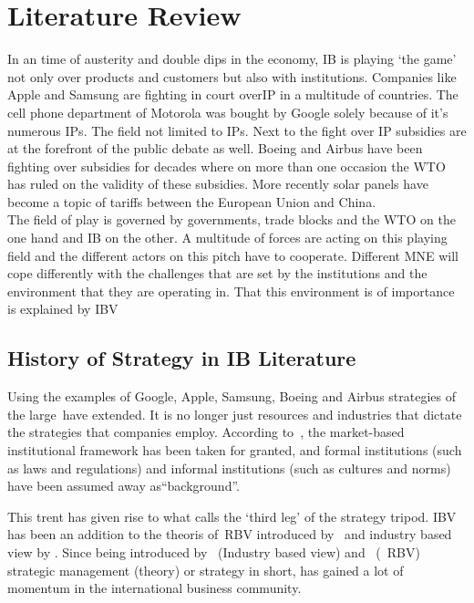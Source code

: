 \chapter{Literature Review}

In an time of austerity and double dips in the economy, \gls{IB} is playing `the game' not only over products and customers but also with institutions. Companies like Apple and Samsung are  fighting in court over\gls{IP} in a multitude of countries. The cell phone department of Motorola was bought by Google solely because of it's numerous \glspl{IP}. The field not limited to \glspl{IP}. Next to the fight over \gls{IP} subsidies are at the forefront of the public debate as well. Boeing and Airbus have been fighting over subsidies for decades where on more than one occasion the \gls{WTO} has ruled on the validity of these subsidies. More recently solar panels have become a topic of tariffs between the European Union and China. \\

The field of play is governed by governments, trade blocks and the \gls{WTO} on the one hand and \gls{IB} on the other.
A multitude of forces are acting on this playing field and the different actors on this pitch have to cooperate. 
Different \gls{MNE} will cope differently with the challenges that are set by the institutions and the environment that they are operating in. That this environment is of importance is explained by \gls{IBV}~\cite{Kostova:1999,Meyer:2009,Wang:2012} 

\section{History of Strategy in IB Literature}
Using the examples of Google, Apple, Samsung, Boeing and Airbus strategies of the large~\mne have extended. It is no longer just resources and industries that dictate the strategies that companies employ. 
According to~\cite{Peng:2009}, the market-based institutional framework has been taken for granted, and formal institutions (such as laws and regulations) and informal institutions (such as cultures and norms) have been assumed away as``background''.

This trent has given rise to what \cite{Peng:2009} calls the `third leg' of the strategy tripod. \Gls{IBV} has been an addition to the theoris of~\gls{RBV} introduced by~\cite{Barney:1991} and industry based view by \cite{Porter:1980}. 
Since being introduced by~\cite{Porter:1980} (Industry based view) and~\cite{Barney:1991} (~\gls{RBV}) strategic management (theory) or strategy in short, has gained a lot of momentum in the international business community. \\ 

